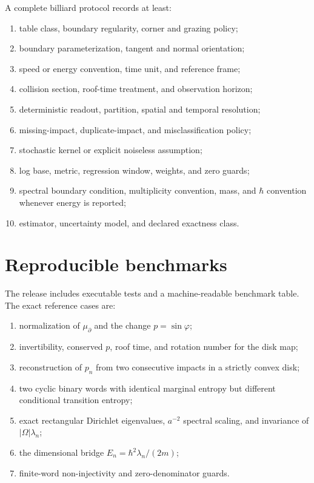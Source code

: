 \documentclass[11pt,a4paper]{article}
\theoremstyle{definition}
\theoremstyle{plain}
\theoremstyle{remark}
\begin{document}
A complete billiard protocol records at least:
\begin{enumerate}[leftmargin=*,itemsep=2pt]
\item table class, boundary regularity, corner and grazing policy;
\item boundary parameterization, tangent and normal orientation;
\item speed or energy convention, time unit, and reference frame;
\item collision section, roof-time treatment, and observation horizon;
\item deterministic readout, partition, spatial and temporal resolution;
\item missing-impact, duplicate-impact, and misclassification policy;
\item stochastic kernel or explicit noiseless assumption;
\item log base, metric, regression window, weights, and zero guards;
\item spectral boundary condition, multiplicity convention, mass, and
      \(\hbar\) convention whenever energy is reported;
\item estimator, uncertainty model, and declared exactness class.
\end{enumerate}

\section{Reproducible benchmarks}

The release includes executable tests and a machine-readable benchmark
table. The exact reference cases are:
\begin{enumerate}[leftmargin=*,itemsep=3pt]
\item normalization of \(\mu_\partial\) and the change
      \(p=\sin\varphi\);
\item invertibility, conserved \(p\), roof time, and rotation number
      for the disk map;
\item reconstruction of \(p_n\) from two consecutive impacts in a
      strictly convex disk;
\item two cyclic binary words with identical marginal entropy but
      different conditional transition entropy;
\item exact rectangular Dirichlet eigenvalues, \(a^{-2}\) spectral
      scaling, and invariance of \(|\Omega|\lambda_n\);
\item the dimensional bridge
      \(E_n=\hbar^2\lambda_n/(2m)\);
\item finite-word non-injectivity and zero-denominator guards.
\end{enumerate}
\end{document}
